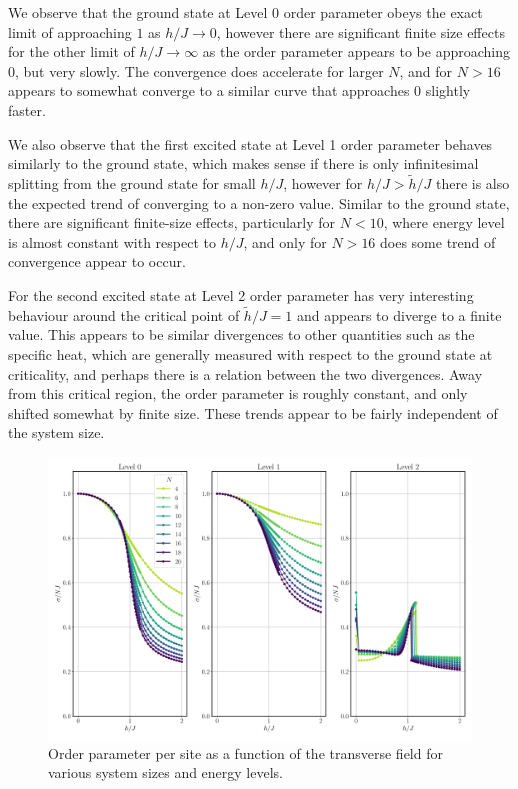 \documentclass[12pt]{article}{}
\begin{document}
We observe that the ground state at Level 0 order parameter obeys the exact limit of approaching $1$ as $h/J \to 0$, however there are significant finite size effects for the other limit of $h/J \to \infty$ as the order parameter appears to be approaching $0$, but very slowly. The convergence does accelerate for larger $N$, and for $N>16$ appears to somewhat converge to a similar curve that approaches $0$ slightly faster.

We also observe that the first excited state at Level 1 order parameter behaves similarly to the ground state, which makes sense if there is only infinitesimal splitting from the ground state for small $h/J$, however for $h/J > \tilde{h}/J$ there is also the expected trend of converging to a non-zero value. Similar to the ground state, there are significant finite-size effects, particularly for $N<10$, where energy level is almost constant with respect to $h/J$, and only for $N>16$ does some trend of convergence appear to occur.

For the second excited state at Level 2 order parameter has very interesting behaviour around the critical point of $\tilde{h}/J = 1$ and appears to diverge to a finite value. This appears to be similar divergences to other quantities such as the specific heat, which are generally measured with respect to the ground state at criticality, and perhaps there is a relation between the two divergences. Away from this critical region, the order parameter is roughly constant, and only shifted somewhat by finite size. These trends appear to be fairly independent of the system size.
\begin{figure}[H]
  \centering
  \includegraphics[width=1\textwidth]{figures/ising/order__h__N.pdf}
  \caption{Order parameter per site as a function of the transverse field for various system sizes and energy levels.}
  \label{fig:ising_order_h_N}
\end{figure}
\end{document}
